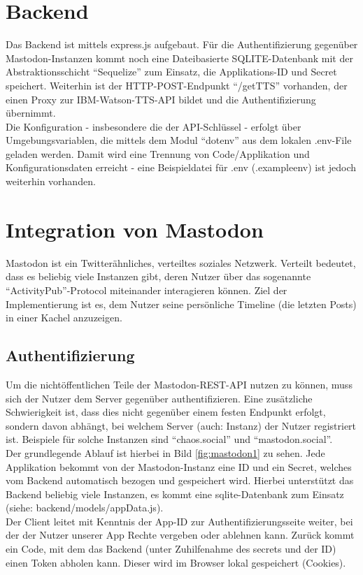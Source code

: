 \documentclass[fleqn,10pt]{SelfArx} %
\begin{document}
\section{Backend}
Das Backend ist mittels express.js aufgebaut. Für die Authentifizierung gegenüber Mastodon-Instanzen kommt noch eine Dateibasierte SQLITE-Datenbank mit der Abstraktionsschicht \enquote{Sequelize} zum Einsatz, die Applikations-ID und Secret speichert. Weiterhin ist der HTTP-POST-Endpunkt \enquote{/getTTS} vorhanden, der einen Proxy zur IBM-Watson-TTS-API bildet und die Authentifizierung übernimmt. \\
Die Konfiguration - insbesondere die der API-Schlüssel - erfolgt über Umgebungsvariablen, die mittels dem Modul \enquote{dotenv} aus dem lokalen .env-File geladen werden. Damit wird eine Trennung von Code/Applikation und Konfigurationsdaten erreicht - eine Beispieldatei für .env (.exampleenv) ist jedoch weiterhin vorhanden.
\section{Integration von Mastodon}
Mastodon ist ein Twitterähnliches, verteiltes soziales Netzwerk. Verteilt bedeutet, dass es beliebig viele Instanzen gibt, deren Nutzer über das sogenannte \enquote{ActivityPub}-Protocol miteinander interagieren können. Ziel der Implementierung ist es, dem Nutzer seine persönliche Timeline (die letzten Posts) in einer Kachel anzuzeigen.
\subsection{Authentifizierung}
Um die nichtöffentlichen Teile der Mastodon-REST-API nutzen zu können, muss sich der Nutzer dem Server gegenüber authentifizieren. Eine zusätzliche Schwierigkeit ist, dass dies nicht gegenüber einem festen Endpunkt erfolgt, sondern davon abhängt, bei welchem Server (auch: Instanz) der Nutzer registriert ist. Beispiele für solche Instanzen sind \enquote{chaos.social} und \enquote{mastodon.social}. \\
Der grundlegende Ablauf ist hierbei in Bild \ref{fig:mastodon1} zu sehen. Jede Applikation bekommt von der Mastodon-Instanz eine ID und ein Secret, welches vom Backend automatisch bezogen und gespeichert wird. Hierbei unterstützt das Backend beliebig viele Instanzen, es kommt eine sqlite-Datenbank zum Einsatz (siehe: backend/models/appData.js).\\ Der Client leitet mit Kenntnis der App-ID zur Authentifizierungsseite weiter, bei der der Nutzer unserer App Rechte vergeben oder ablehnen kann. Zurück kommt ein Code, mit dem das Backend (unter Zuhilfenahme des secrets und der ID) einen Token abholen kann. Dieser wird im Browser lokal gespeichert (Cookies).
\end{document}
